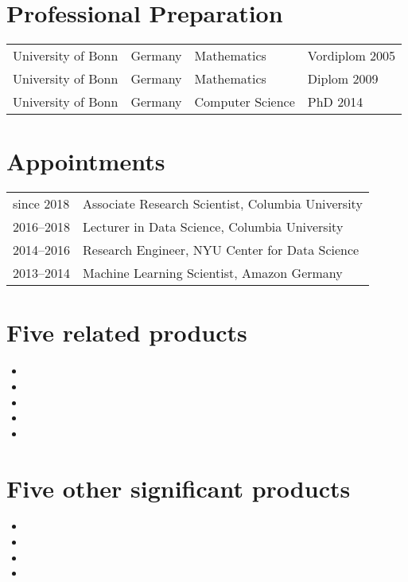 \documentclass[11pt,letterpaper]{article}
\newcounter{required}
\begin{document}


\section*{Professional Preparation}
\begin{tabular}{l l l l}
University of Bonn& Germany& Mathematics     &  Vordiplom 2005\\
University of Bonn& Germany& Mathematics     &  Diplom 2009\\
University of Bonn& Germany& Computer Science&  PhD 2014\\
\end{tabular}

\section*{Appointments}
\begin{tabular}{l l}
since 2018& Associate Research Scientist, Columbia University\\
2016--2018& Lecturer in Data Science, Columbia University\\
2014--2016& Research Engineer, NYU Center for Data Science\\
2013--2014& Machine Learning Scientist, Amazon Germany\\
\end{tabular}

\section*{Five related products}
\begin{itemize}
    \item {}
    \item {}  %
    \item {}            %
    \item {}
    \item {}             
\end{itemize}
\pagebreak
\section*{Five other significant products}
\begin{itemize}
    \item {}
    \item {}
    \item {}
    \item {}
\end{itemize}
\end{document}
